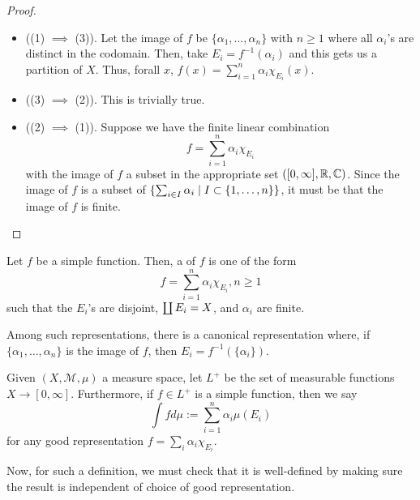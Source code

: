 \documentclass[11pt,leqno,oneside]{amsbook}
\numberwithin{thm}{section}
\newcommand{\M}{\mathcal{M}}
\begin{document}
 \begin{proof}
   \begin{itemize}
   \item ((1) $\implies$ (3)). Let the image of $f$ be $\{\alpha_1,
     \ldots, \alpha_n\}$ with $n \geq 1$ where all $\alpha_i$'s are
     distinct in the codomain. Then, take $E_i = f^{-1}(\alpha_i)$ and
     this gets us a partition of $X$. Thus, forall $x$, $f(x) =
     \sum_{i=1}^n \alpha_i \chi_{E_i}(x)$.
   \item ((3) $\implies$ (2)). This is trivially true.
   \item ((2) $\implies$ (1)). Suppose we have the finite linear
     combination \[
       f = \sum_{i=1}^n \alpha_i \chi_{E_i}
     \]
     with the image of $f$ a subset in the appropriate set
     $([0,\infty],{\mathbb R},{\mathbb C})$. Since the image of $f$ is a subset of
     $\{\sum_{i \in I} \alpha_i \mid I \subset \{1,\ldots,n\}\}$, it
     must be that the image of $f$ is finite.
   \end{itemize}
 \end{proof}
 \begin{defn}
   Let $f$ be a simple function. Then, a  of
   $f$ is one of the form \[
     f = \sum_{i=1}^n \alpha_i \chi_{E_i}, n \geq 1
   \]
   such that the $E_i$'s are disjoint, $\coprod E_i = X$, and
   $\alpha_i$ are finite.
 \end{defn}
Among such representations, there is a canonical representation where,
if $\{\alpha_1, \ldots, \alpha_n\}$ is the image of $f$, then $E_i =
f^{-1}(\{\alpha_i\})$. 
\begin{defn}
  Given $(X, \M, \mu)$ a measure space, let $L^+$ be the set of
  measurable functions $X \to [0,\infty]$. Furthermore, if $f \in L^+$
  is a simple function, then we say \[
    \int f d\mu := \sum_{i=1}^n \alpha_i \mu(E_i)
  \]
  for any good representation $f = \sum_i \alpha_i \chi_{E_i}$. 
\end{defn}
Now, for such a definition, we must check that it is well-defined by
making sure the result is independent of choice of good
representation.
\end{document}
